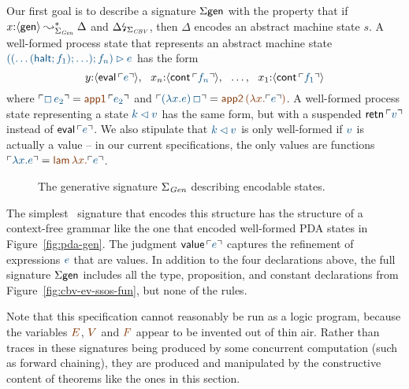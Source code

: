 
Our first goal is to describe a signature $\Sigma\sf gen$ with the
property that if $x{:}\langle {\sf gen} \rangle \leadsto^*_{\Sigma_{\it Gen}}
\Delta$ and ${\Delta}{\mbox{\lightning}}_{\Sigma_{\it CBV}}$, then $\Delta$ encodes
an abstract machine state
$s$. A well-formed process state that represents an abstract machine
state $\obj{((\ldots({\sf halt}; f_1); \ldots); f_n) \rhd e}$ has the form
\[
y{:}\susp{{\sf eval}\,\interp{e}}, ~~
x_n{:}\susp{{\sf cont}\,\interp{f_n}}, ~~
\ldots, ~~
x_1{:}\susp{{\sf cont}\,\interp{f_1}}
\]
where $\interp{\Box\,e_2} = \lf{{\sf app1}\,\interp{e_2}}$ and
$\interp{(\lambda x.e)\,\Box} = \lf{{\sf app2}\,(\lambda x.\interp{e})}$. 
A well-formed process state representing a state $\obj{k \lhd v}$ has 
the same form, but with a suspended ${\sf retn}\,\interp{v}$ instead
of ${\sf eval}\,\interp{e}$. We also stipulate that 
$\obj{k \lhd v}$ is only well-formed if $\obj{v}$ is actually a value
-- in our current specifications, the only values are functions
$\interp{\lambda x.e} = \lf{{\sf lam}\,\lambda x. \interp{e}}$.

\begin{figure}
\caption{The generative signature $\Sigma_{\it Gen}$ 
 describing encodable states.}
\label{fig:cbv-ev-ssos-gen}
\end{figure}

The simplest \sls~signature that encodes this structure has the
structure of a context-free grammar like the one that encoded
well-formed PDA states in Figure~\ref{fig:pda-gen}. The judgment ${\sf
  value}\,\interp{e}$ captures the refinement of expressions $\obj{e}$
that are values. In addition to the four declarations above, the full
signature $\Sigma\sf gen$ includes all the type, proposition, and
constant declarations from Figure~\ref{fig:cbv-ev-ssos-fun}, but none
of the rules.

Note that this specification cannot reasonably be run as a logic
program, because the variables $\lf{E}$, $\lf{V}$ and $\lf{F}$ appear
to be invented out of thin air.  Rather than traces in these
signatures being produced by some concurrent computation (such as
forward chaining), they are produced and manipulated by the
constructive content of theorems like the ones in this section.

